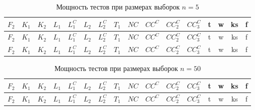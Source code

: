 \documentclass{article}
\begin{document}
\begin{longtable}{|c|c|c|c|c|c|c|c|c|c|c|c|c|c|c|c|}
  \caption{Мощность тестов при размерах выборок $n=5$}
  \label{table:n5} \\
  \hline
  $F_2$ & $K_{1}$ & $K_{2}$ & $L_{1}$ & $L_{1}^C$ & $L_{2}$ & $L_{2}^C$ & $T_1$ & $NC$ & $CC^C$ & $CC_2^C$ & $CC_3^C$ & t & w & ks & f \\ \hline
  
  
  
  
  $F_2$ & $K_{1}$ & $K_{2}$ & $L_{1}$ & $L_{1}^C$ & $L_{2}$ & $L_{2}^C$ & $T_1$ & $NC$ & $CC^C$ & $CC_2^C$ & $CC_3^C$ & t & w & ks & f \\ \hline
  
  
  
  
  $F_2$ & $K_{1}$ & $K_{2}$ & $L_{1}$ & $L_{1}^C$ & $L_{2}$ & $L_{2}^C$ & $T_1$ & $NC$ & $CC^C$ & $CC_2^C$ & $CC_3^C$ & t & w & ks & f \\ \hline
  
  
  
  
\end{longtable}

\begin{longtable}{|c|c|c|c|c|c|c|c|c|c|c|c|c|c|c|c|}
  \caption{Мощность тестов при размерах выборок $n=50$}
  \label{table:n50} \\
  \hline
  $F_2$ & $K_{1}$ & $K_{2}$ & $L_{1}$ & $L_{1}^C$ & $L_{2}$ & $L_{2}^C$ & $T_1$ & $NC$ & $CC^C$ & $CC_2^C$ & $CC_3^C$ & t & w & ks & f \\ \hline
  
  
  
  
  $F_2$ & $K_{1}$ & $K_{2}$ & $L_{1}$ & $L_{1}^C$ & $L_{2}$ & $L_{2}^C$ & $T_1$ & $NC$ & $CC^C$ & $CC_2^C$ & $CC_3^C$ & t & w & ks & f \\ \hline
  
  
  
  
\end{longtable}
\end{document}
